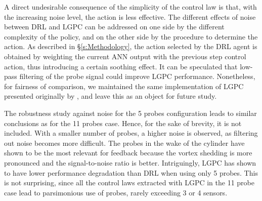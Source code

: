 A direct undesirable consequence of the simplicity of the control law is that, with the increasing noise level, the action is less effective. The different effects of noise between DRL and LGPC can be addressed on one side by the different complexity of the policy, and on the other side by the procedure to determine the action. As described in \S \ref{s:Methodology}, the action selected by the DRL agent is obtained by weighting the current ANN output with the previous step control action, thus introducing a certain soothing effect. It can be speculated that low-pass filtering of the probe signal could improve LGPC performance. Nonetheless, for fairness of comparison, we maintained the same implementation of LGPC presented originally by \citet{li2017GP}, and leave this as an object for future study.

The robustness study against noise for the 5 probes configuration leads to similar conclusions as for the 11 probes case. Hence, for the sake of brevity, it is not included. With a smaller number of probes, a higher noise is observed, as filtering out noise becomes more difficult. The probes in the wake of the cylinder have shown to be the most relevant for feedback because the vortex shedding is more pronounced and the signal-to-noise ratio is better. Intriguingly, LGPC has shown to have lower performance degradation than DRL when using only 5 probes. This is not surprising, since all the control laws extracted with LGPC in the 11 probe case lead to parsimonious use of probes, rarely exceeding 3 or 4 sensors.

